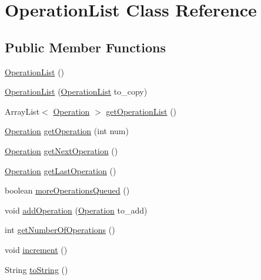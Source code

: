 \hypertarget{classOperationList}{\section{\-Operation\-List \-Class \-Reference}
\label{classOperationList}
}
\subsection*{\-Public \-Member \-Functions}
\begin{DoxyCompactItemize}
\item 
\hyperlink{classOperationList_a1ab8693ff3f4043e023c0f3e55b5a22b}{\-Operation\-List} ()
\item 
\hyperlink{classOperationList_a8f3be80cbd49542d00ce5f122ba7e06b}{\-Operation\-List} (\hyperlink{classOperationList}{\-Operation\-List} to\-\_\-copy)
\item 
\-Array\-List$<$ \hyperlink{classOperation}{\-Operation} $>$ \hyperlink{classOperationList_a8eab211c05128d5926984a11e0342d8c}{get\-Operation\-List} ()
\item 
\hyperlink{classOperation}{\-Operation} \hyperlink{classOperationList_a0a2b5d92ab9462e4bdbcb8bbc52e7445}{get\-Operation} (int num)
\item 
\hyperlink{classOperation}{\-Operation} \hyperlink{classOperationList_a97099cc539ae05decfdd605393a6d112}{get\-Next\-Operation} ()
\item 
\hyperlink{classOperation}{\-Operation} \hyperlink{classOperationList_aecb2723ffeae4508133041105566e77f}{get\-Last\-Operation} ()
\item 
boolean \hyperlink{classOperationList_af3d91752e3eb3a37b506e23a713537b8}{more\-Operations\-Queued} ()
\item 
void \hyperlink{classOperationList_a2a4d8bcf86f75195c0f3602c0f531d25}{add\-Operation} (\hyperlink{classOperation}{\-Operation} to\-\_\-add)
\item 
int \hyperlink{classOperationList_a5f876fb038cc124f2422b99f565e24e9}{get\-Number\-Of\-Operations} ()
\item 
void \hyperlink{classOperationList_af4ceec1cc813de10aa194a15dd64fccb}{increment} ()
\item 
\-String \hyperlink{classOperationList_afa338da3a6aaeebc5207c666faf1da9d}{to\-String} ()
\end{DoxyCompactItemize}
